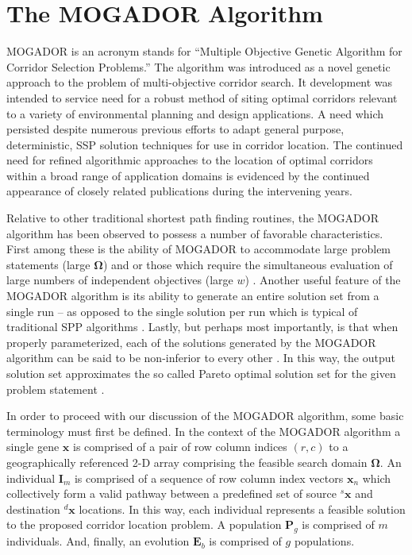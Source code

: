 \section{The MOGADOR Algorithm}
            
MOGADOR is an acronym stands for “Multiple Objective Genetic Algorithm for Corridor Selection Problems.” \cite{Zhang2008} The algorithm was introduced as a novel genetic approach to the problem of multi-objective corridor search. \cite{Mooney2006, Zhang2008} It development was intended to service need for a robust method of siting optimal corridors relevant to a variety of environmental planning and design applications. \cite{Bennett2004, Chakhar2003, Zhou1996} A need which persisted despite numerous previous efforts to adapt general purpose, deterministic, SSP solution techniques for use in corridor location. \cite{Hallam2001, Jankowski1995, Lombard1993} The continued need for refined algorithmic approaches to the location of optimal corridors within a broad range of application domains is evidenced by the continued appearance of closely related publications during the intervening years. \cite{Aissi2012, Mousseau2010, Neema2010, Roberts2010, Scaparra2014, Tsai2011} 

Relative to other traditional shortest path finding routines, the MOGADOR algorithm has been observed to possess a number of favorable characteristics. First among these is the ability of MOGADOR to accommodate large problem statements (large $\boldsymbol{\Omega}$) and or those which require the simultaneous evaluation of large numbers of independent objectives (large $w$) \cite{Pangilinan2007, Zhang2008}. Another useful feature of the MOGADOR algorithm is its ability to generate an entire solution set from a single run – as opposed to the single solution per run which is typical of traditional SPP algorithms \cite{Cherkassky1996, Dreyfus1969, Hart1968, Zhang2008}. Lastly, but perhaps most importantly, is that when properly parameterized, each of the solutions generated by the MOGADOR algorithm can be said to be non-inferior to every other \cite{Zhang et al 2008}. In this way, the output solution set approximates the so called Pareto optimal solution set for the given problem statement \cite{Deb 2014}.  

In order to proceed with our discussion of the MOGADOR algorithm, some basic terminology must first be defined. In the context of the MOGADOR algorithm a single gene $\textbf{x}$ is comprised of a pair of row column indices $(r,c)$ to a geographically referenced 2-D array comprising the feasible search domain $\boldsymbol{\Omega}$. An individual $\textbf{I}_m$ is comprised of a sequence of row column index vectors $\textbf{x}_n$ which collectively form a valid pathway between a predefined set of source ${}^{s}\textbf{x}$ and destination ${}^{d}\textbf{x}$ locations. In this way, each individual represents a feasible solution to the proposed corridor location problem. A population $\textbf{P}_g$ is comprised of $m$ individuals. And, finally, an evolution $\textbf{E}_b$ is comprised of $g$ populations.

